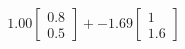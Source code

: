 \documentclass[preview]{standalone}
\begin{document}
\begin{align*}
1.00 \begin{bmatrix} 0.8 \\ 0.5 \end{bmatrix} + -1.69 \begin{bmatrix} 1 \\ 1.6 \end{bmatrix}
\end{align*}
\end{document}
